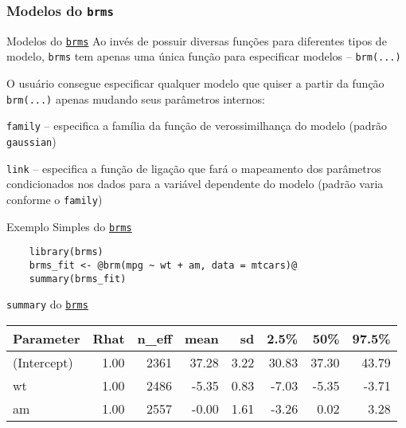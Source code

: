 \subsubsection{Modelos do \texttt{brms}}
\begin{frame}{Modelos do \href{https://paul-buerkner.github.io/brms/}{\texttt{brms}}}
    Ao invés de possuir diversas funções para diferentes tipos de modelo,
    \texttt{brms} tem apenas uma única função para especificar modelos --
    \lstinline!brm(...)!
    \par
    O usuário consegue especificar qualquer modelo que quiser a partir da função
    \lstinline!brm(...)! apenas mudando seus parâmetros internos:
    \begin{vfilleditems}
        \item \lstinline!family! -- especifica a família da função de verossimilhança
        do modelo (padrão \lstinline!gaussian!)
        \item \lstinline!link! -- especifica a função de ligação
        que fará o mapeamento dos parâmetros condicionados nos dados para a variável
        dependente do modelo (padrão varia conforme o \lstinline!family!)
    \end{vfilleditems}
\end{frame}
\begin{frame}[fragile]{Exemplo Simples do \href{https://paul-buerkner.github.io/brms/}{\texttt{brms}}}
    \begin{lstlisting}
    library(brms)
    brms_fit <- @brm(mpg ~ wt + am, data = mtcars)@
    summary(brms_fit)
    \end{lstlisting}
\end{frame}

\begin{frame}{\texttt{summary} do \href{https://paul-buerkner.github.io/brms/}{\texttt{brms}}}
    \begin{table}[ht]
        \centering
        \begin{tabular}{lrrrrrrr}
        \toprule
        Parameter & Rhat & n\_eff & mean & sd & 2.5\% & 50\% & 97.5\% \\
        \midrule
        (Intercept) & 1.00 & 2361 & 37.28 & 3.22 & 30.83 & 37.30 & 43.79 \\
        wt & 1.00 & 2486 & -5.35 & 0.83 & -7.03 & -5.35 & -3.71 \\
        am & 1.00 & 2557 & -0.00 & 1.61 & -3.26 & 0.02 & 3.28 \\
        \bottomrule
        \end{tabular}
        \end{table}
\end{frame}

